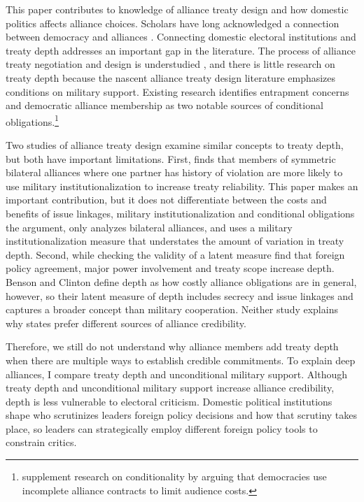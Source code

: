 \documentclass[12pt]{article}
\begin{document}
This paper contributes to knowledge of alliance treaty design and how domestic politics affects alliance choices.
Scholars have long acknowledged a connection between democracy and alliances \citep{LaiReiter2000, GiblerWolford2006, Mattes2012, Warren2016, McManusYarhi-Milo2017}. 
Connecting domestic electoral institutions and treaty depth addresses an important gap in the literature. 
The process of alliance treaty negotiation and design is understudied \citep{Poast2019a}, and there is little research on treaty depth because the nascent alliance treaty design literature emphasizes conditions on military support.
Existing research identifies entrapment concerns \citep{Kim2011, Benson2012} and democratic alliance membership \citep{Mattes2012, Chibaetal2015} as two notable sources of conditional obligations.\footnote{\citet{FjelstulReiter2019} supplement research on conditionality by arguing that democracies use incomplete alliance contracts to limit audience costs.} 


Two studies of alliance treaty design examine similar concepts to treaty depth, but both have important limitations.   
First, \citet{Mattes2012} finds that members of symmetric bilateral alliances where one partner has history of violation are more likely to use military institutionalization to increase treaty reliability. 
This paper makes an important contribution, but it does not differentiate between the costs and benefits of issue linkages, military institutionalization and conditional obligations the argument, only analyzes bilateral alliances, and uses a military institutionalization measure \citep{LeedsAnac2005} that understates the amount of variation in treaty depth.  
Second, while checking the validity of a latent measure \citet{BensonClinton2016} find that foreign policy agreement, major power involvement and treaty scope increase depth. 
Benson and Clinton define depth as how costly alliance obligations are in general, however, so their latent measure of depth includes secrecy and issue linkages and captures a broader concept than military cooperation. 
Neither study explains why states prefer different sources of alliance credibility. 


Therefore, we still do not understand why alliance members add treaty depth when there are multiple ways to establish credible commitments. 
To explain deep alliances, I compare treaty depth and unconditional military support.  
Although treaty depth and unconditional military support increase alliance credibility, depth is less vulnerable to electoral criticism. 
Domestic political institutions shape who scrutinizes leaders foreign policy decisions and how that scrutiny takes place, so leaders can strategically employ different foreign policy tools to constrain critics. 
\end{document}
